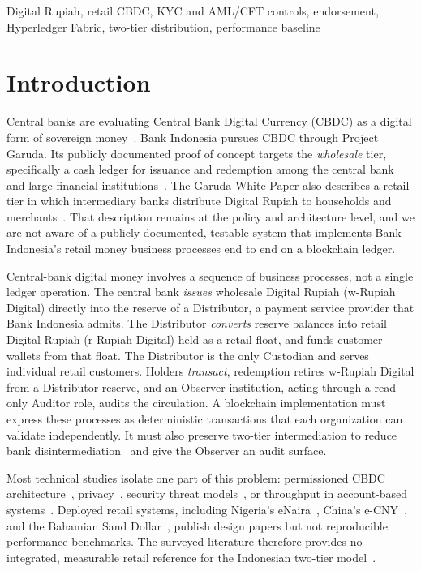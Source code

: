 \documentclass[conference]{IEEEtran}
\begin{document}
\begin{IEEEkeywords}
Digital Rupiah, retail CBDC, KYC and AML/CFT controls, endorsement,
Hyperledger Fabric, two-tier distribution, performance baseline
\end{IEEEkeywords}

\section{Introduction}
Central banks are evaluating Central Bank Digital Currency (CBDC) as a digital
form of sovereign money~\cite{Kiff2020A}. Bank Indonesia pursues CBDC through
Project Garuda. Its publicly documented proof of concept targets the
\emph{wholesale} tier, specifically a cash ledger for issuance and redemption
among the central bank and large financial
institutions~\cite{bi_garuda_poc,bi_whitepaper2022}. The Garuda White Paper also
describes a retail tier in which intermediary banks distribute Digital Rupiah to
households and merchants~\cite{bi_whitepaper2022}. That description remains at the policy and
architecture level, and we are not aware of a publicly documented, testable
system that implements Bank Indonesia's retail money business processes end to
end on a blockchain ledger.

Central-bank digital money involves a sequence of business processes, not a
single ledger operation. The central bank \emph{issues} wholesale Digital Rupiah
(w-Rupiah Digital) directly into the reserve of a Distributor, a payment service
provider that Bank Indonesia admits. The Distributor \emph{converts} reserve
balances into retail Digital Rupiah (r-Rupiah Digital) held as a retail float, and
funds customer wallets from that float. The Distributor is the only Custodian and
serves individual retail customers. Holders \emph{transact}, redemption retires
w-Rupiah Digital from a Distributor reserve, and an Observer institution, acting
through a read-only Auditor role,
audits the circulation. A blockchain implementation must express these
processes as deterministic transactions that each organization can validate
independently. It must also preserve two-tier intermediation to reduce bank
disintermediation~\cite{Auer2020The} and give the Observer an audit surface.

Most technical studies isolate one part of this problem: permissioned CBDC
architecture~\cite{bhawana2021}, privacy~\cite{islam2023}, security threat
models~\cite{hans2023}, or throughput in account-based
systems~\cite{Lovejoy2022A}. Deployed retail systems, including Nigeria's
eNaira~\cite{ree2023enaira}, China's e-CNY~\cite{pboc2021ecny}, and the Bahamian
Sand Dollar~\cite{centralbankbahamas2020sanddollar}, publish design papers but
not reproducible performance benchmarks. The surveyed literature therefore
provides no integrated, measurable retail reference for the Indonesian
two-tier model~\cite{sethaput2025,aryani2023critlit}.
\end{document}
